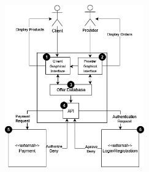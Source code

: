 \begin{table}[H]
	\begin{minipage}{0.45\linewidth}
		\centering
		\includegraphics[width=6cm]{assets/risk_technical_context.jpg}
		\label{ }
	\end{minipage}
\end{table}



